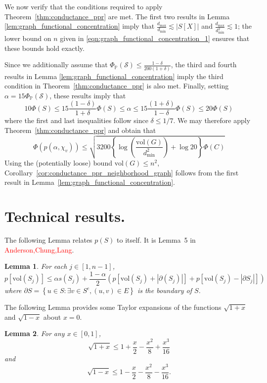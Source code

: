 \documentclass{article}
\newcommand{\abs}[1]{\left \lvert #1 \right \rvert}
\newcommand{\vol}{\mathrm{vol}}
\newcommand{\set}[1]{\left\{#1\right\}}
\newcommand{\Pbb}{\mathbb{P}}
\newcommand{\1}{\mathbf{1}}
\theoremstyle{alden}
\theoremstyle{aldenthm}
\newtheorem{lemma}{Lemma}
\theoremstyle{remark}
\begin{document}
We now verify that the conditions required to apply Theorem~\ref{thm:conductance_ppr} are met. The first two results in Lemma \ref{lem:graph_functional_concentration} imply that $\frac{d_{\max}}{d_{\min}} \lesssim \abs{S[X]}$ and $\frac{d_{\max}}{d_{\min}^2} \lesssim 1$; the lower bound on $n$ given in \eqref{eqn:graph_functional_concentration_1} ensures that these bounds hold exactly.

Since we additionally assume that $\Phi_{\Pbb}(\mathcal{S}) \leq \frac{1 - \delta}{200(1 + \delta)}$, the third and fourth results in Lemma \ref{lem:graph_functional_concentration} imply the third condition in Theorem~\ref{thm:conductance_ppr} is also met. Finally, setting $\alpha = 15\Phi_{\Pbb}(\mathcal{S})$, these results imply that
\begin{equation*}
10 \Phi(S)\leq 15\frac{(1 - \delta)}{1 + \delta} \Phi(S)\leq \alpha \leq 15\frac{(1 + \delta)}{1 - \delta} \Phi(S) \leq 20 \Phi(S)
\end{equation*}
where the first and last inequalities follow since $\delta \leq 1/7$. We may therefore apply Theorem~\ref{thm:conductance_ppr} and obtain that
\begin{equation*}
\Phi(p(\alpha,\chi_v)) \leq \sqrt{3200\left\{\log\left(\frac{\vol(G)}{d_{\min}^2}\right) + \log 20\right\} \Phi(C)}
\end{equation*}
Using the (potentially loose) bound $\vol(G) \leq n^2$, Corollary~\ref{cor:conductance_ppr_neighborhood_graph} follows from the first result in Lemma~\ref{lem:graph_functional_concentration}.

\section{Technical results.}

The following Lemma relates $p(S)$ to itself. It is Lemma~5 in \textcolor{red}{Anderson,Chung,Lang}.
\begin{lemma}
	\label{lem:acl_1}
	For each $j \in [1,n-1]$,
	\begin{equation*}
	p[\vol(S_j)] \leq \alpha s(S_j) + \frac{1 - \alpha}{2} \left(p[\vol(S_j) + \abs{\partial(S_j)}] + p[\vol(S_j) - \abs{\partial{S_j}}]  \right)
	\end{equation*}
	where $\partial{S} = \set{u \in S: \exists v \in S^c, (u,v) \in E}$ is the boundary of $S$.
\end{lemma}

The following Lemma provides some Taylor expansions of the functions $\sqrt{1 + x}$ and $\sqrt{1 - x}$ about $x = 0$.
\begin{lemma}
	\label{lem:taylor_expansion}
	For any $x \in [0,1]$,
	\begin{equation*}
	\sqrt{1 + x} \leq 1 + \frac{x}{2} - \frac{x^2}{8} + \frac{x^3}{16}
	\end{equation*}
	and
	\begin{equation*}
	\sqrt{1 - x} \leq 1 - \frac{x}{2} - \frac{x^2}{8} - \frac{x^3}{16}.
	\end{equation*}
\end{lemma}
\end{document}
